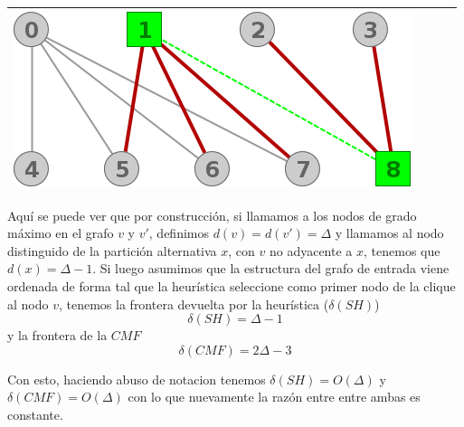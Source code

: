\begin{center}
\begin{tabular}{|c||c||c||c|}
			\includegraphics[scale = 0.2]{img/ej3/constructiva_golosa/k5,4Nocompleto_st12.png} \\
		\hline
		\end{tabular}
	\end{center}

	Aqu\'i se puede ver que por construcci\'on, si llamamos a los nodos de grado m\'aximo en el grafo
	$v$ y $v'$, definimos $d(v) = d(v') = \Delta$ y llamamos al nodo distinguido de la partici\'on
	alternativa $x$, con $v$ no adyacente a $x$, tenemos que $d(x) = \Delta -1$. 
	Si luego asumimos que la estructura del grafo de entrada viene ordenada de forma tal que la 
	heur\'istica seleccione como primer nodo de la clique al nodo $v$, tenemos la frontera
	devuelta por la heur\'istica ($\delta(SH)$)
	\[\delta(SH) = \Delta -1 \]
	y la frontera de la $CMF$
	\[\delta(CMF) = 2 \Delta -3 \]

	Con esto, haciendo abuso de notacion tenemos $\delta(SH) = O(\Delta)$ y $\delta(CMF) = O(\Delta)$ con 
	lo que nuevamente la raz\'on entre entre ambas es constante.

